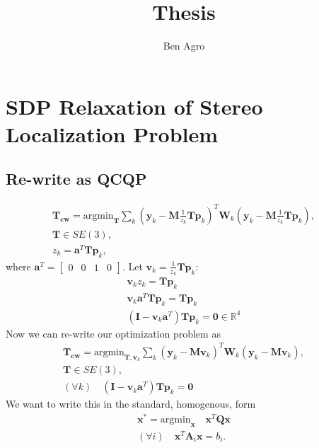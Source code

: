 \documentclass{article}
\title{Thesis}
\author{Ben Agro}
\date{}
\begin{document}
\maketitle

\section{SDP Relaxation of Stereo Localization Problem}

\subsection{Re-write as QCQP}

\begin{align}
\mathbf{T_{cw}} = \text{argmin}_{\mathbf{T}} \sum_k (\mathbf{y}_k - \mathbf{M} \frac{1}{z_k} \mathbf{T} \mathbf{p}_k)^T \mathbf{W}_k (\mathbf{y}_k - \mathbf{M} \frac{1}{z_k} \mathbf{T} \mathbf{p}_k),\\
\mathbf{T} \in SE(3),\\
z_k = \mathbf{a}^T \mathbf{T} \mathbf{p}_k,
\end{align}
where $\mathbf{a}^T = \begin{bmatrix}0 & 0 & 1 & 0\end{bmatrix}.$
Let $\mathbf{v}_k = \frac{1}{z_k}\mathbf{T}\mathbf{p}_k$:
\begin{align}
\mathbf{v}_kz_k = \mathbf{T}\mathbf{p}_k\\
\mathbf{v}_k \mathbf{a}^T \mathbf{T} \mathbf{p}_k = \mathbf{T}\mathbf{p}_k\\
(\mathbf{I} - \mathbf{v}_k \mathbf{a}^T)\mathbf{T}\mathbf{p}_k = \mathbf{0} \in \mathbb R^4
\end{align}
Now we can re-write our optimization problem as
\begin{align}
\mathbf{T_{cw}} = \text{argmin}_{\mathbf{T}, \mathbf{v}_k} \sum_k (\mathbf{y}_k - \mathbf{M} \mathbf{v}_k)^T \mathbf{W}_k (\mathbf{y}_k - \mathbf{M} \mathbf{v}_k),\\
\mathbf{T} \in SE(3),\\
(\forall k) \quad (\mathbf{I} - \mathbf{v}_k \mathbf{a}^T)\mathbf{T}\mathbf{p}_k = \mathbf{0}
\end{align}
We want to write this in the standard, homogenous, form 
\begin{align}
\mathbf{x}^* = \text{argmin}_{\mathbf{x}} \quad \mathbf{x}^T \mathbf{Q} \mathbf{x}\\
(\forall i) \quad \mathbf{x}^T \mathbf{A}_i \mathbf{x} = b_i.
\end{align}
\end{document}
